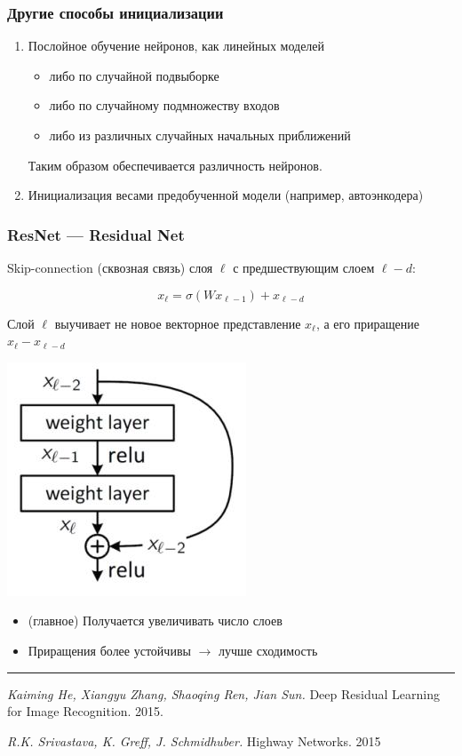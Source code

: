 \documentclass[fullscreen=true, bookmarks=true, hyperref={pdfencoding=unicode}]{beamer}
\begin{document}
\begin{frame}
  \frametitle{Другие способы инициализации}
  \begin{enumerate}
    \item Послойное обучение нейронов, как линейных моделей
      \begin{itemize}
        \item либо по случайной подвыборке
        \item либо по случайному подмножеству входов
        \item либо из различных случайных начальных приближений
      \end{itemize}

    Таким образом обеспечивается различность нейронов.

    \item Инициализация весами предобученной модели (например, автоэнкодера)
  \end{enumerate}

\end{frame}


\begin{frame}
  \frametitle{ResNet — Residual Net}

  Skip-connection (сквозная связь) слоя $\ell$ с предшествующим слоем $\ell - d$:

  $$ x_\ell = \sigma(Wx_{\ell-1}) + x_{\ell-d}$$

  Слой $\ell$ выучивает не новое векторное представление $x_\ell$, а его приращение $x_\ell - x_{\ell-d}$

  \begin{center}
    \includegraphics[keepaspectratio,
                     width=.3\paperwidth]{skip-connection.jpg}
  \end{center}
\end{frame}

\begin{frame}
  \begin{itemize}
    \item (главное) Получается увеличивать число слоев
    \item Приращения более устойчивы $\to$ лучше сходимость
  \end{itemize}

  \noindent\rule{8cm}{0.4pt}

  {\it Kaiming He, Xiangyu Zhang, Shaoqing Ren, Jian Sun.} Deep Residual Learning for Image Recognition. 2015.

  {\it R.K. Srivastava, K. Greff, J. Schmidhuber.} Highway Networks. 2015
\end{frame}
\end{document}
